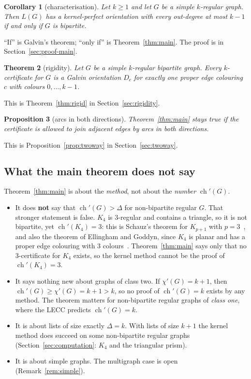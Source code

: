 \documentclass[11pt]{article}
\theoremstyle{plain}
\newtheorem{maintheorem}{Theorem}
\newtheorem{maincorollary}[maintheorem]{Corollary}
\newtheorem{mainproposition}[maintheorem]{Proposition}
\theoremstyle{definition}
\theoremstyle{remark}
\newcommand{\LG}{L(G)}
\newcommand{\chil}{\operatorname{ch}'}
\newcommand{\chie}{\chi'}
\begin{document}
\begin{maincorollary}[characterisation]\label{cor:char}
Let $k\ge 1$ and let $G$ be a simple $k$-regular graph. Then $\LG$ has a kernel-perfect
orientation with every out-degree at most $k-1$ if and only if $G$ is bipartite.
\end{maincorollary}

``If'' is Galvin's theorem; ``only if'' is Theorem~\ref{thm:main}. The proof is in
Section~\ref{sec:proof-main}.

\begin{maintheorem}[rigidity]\label{thm:rigid-intro}
Let $G$ be a simple $k$-regular bipartite graph. Every $k$-certificate for $G$ is a Galvin
orientation $D_c$ for exactly one proper edge colouring $c$ with colours $0,\dots,k-1$.
\end{maintheorem}

This is Theorem~\ref{thm:rigid} in Section~\ref{sec:rigidity}.

\begin{mainproposition}[arcs in both directions]\label{prop:twoway-intro}
Theorem~\ref{thm:main} stays true if the certificate is allowed to join adjacent edges by arcs in
both directions.
\end{mainproposition}

This is Proposition~\ref{prop:twoway} in Section~\ref{sec:twoway}.

\subsection{What the main theorem does not say}\label{sec:not-say}

Theorem~\ref{thm:main} is about the \emph{method}, not about the \emph{number} $\chil(G)$.

\begin{itemize}
  \item It does \textbf{not} say that $\chil(G)>\Delta$ for non-bipartite regular $G$. That
    stronger statement is false. $K_4$ is $3$-regular and contains a triangle, so it is not
    bipartite, yet $\chil(K_4)=3$: this is Schauz's theorem for $K_{p+1}$ with
    $p=3$~\cite{schauz14}, and also the theorem of Ellingham and Goddyn, since $K_4$ is planar and
    has a proper edge colouring with $3$ colours~\cite{eg}. Theorem~\ref{thm:main} says only that
    no $3$-certificate for $K_4$ exists, so the kernel method cannot be the proof of
    $\chil(K_4)=3$.
  \item It says nothing new about graphs of class two. If $\chie(G)=k+1$, then
    $\chil(G)\ge\chie(G)=k+1>k$, so no proof of $\chil(G)=k$ exists by any method. The theorem
    matters for non-bipartite regular graphs of \emph{class one}, where the LECC predicts
    $\chil(G)=k$.
  \item It is about lists of size exactly $\Delta=k$. With lists of size $k+1$ the kernel method
    does succeed on some non-bipartite regular graphs (Section~\ref{sec:computation}: $K_4$ and
    the triangular prism).
  \item It is about simple graphs. The multigraph case is open (Remark~\ref{rem:simple}).
\end{itemize}
\end{document}
